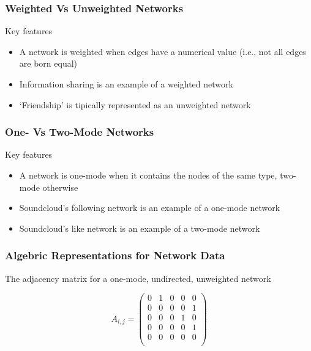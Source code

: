 \documentclass[notes, aspectratio=1610]{beamer}
\begin{document}
\begin{frame}
	\frametitle{Weighted Vs Unweighted Networks}

	Key features

		\begin{itemize}
			\item A network is weighted when edges have a numerical value
			(i.e., not all edges are born equal)
			\item Information sharing is an example of a
			weighted network 
			\item `Friendship' is tipically represented as an unweighted
			network
		\end{itemize}

\end{frame}

\begin{frame}
	\frametitle{One- Vs Two-Mode Networks}

	Key features

		\begin{itemize}
			\item A network is one-mode when it contains the nodes 
			of the same type, two-mode otherwise
			\item Soundcloud's following network is an example of a
			one-mode network 
			\item Soundcloud's like network is an example of a two-mode
			network
		\end{itemize}

\end{frame}

\begin{frame}
	\frametitle{Algebric Representations for Network Data}

	The adjacency matrix for a one-mode, undirected, unweighted network

        \begin{equation}
        A_{i,j} = 
         \begin{pmatrix}
          0 & 1 & 0 & 0 & 0 \\
          0 & 0 & 0 & 0 & 1 \\
          0 & 0 & 0 & 1 & 0 \\
          0 & 0 & 0 & 0 & 1 \\
          0 & 0 & 0 & 0 & 0 \\
         \end{pmatrix}
        \end{equation}
	
\end{frame}
\end{document}
